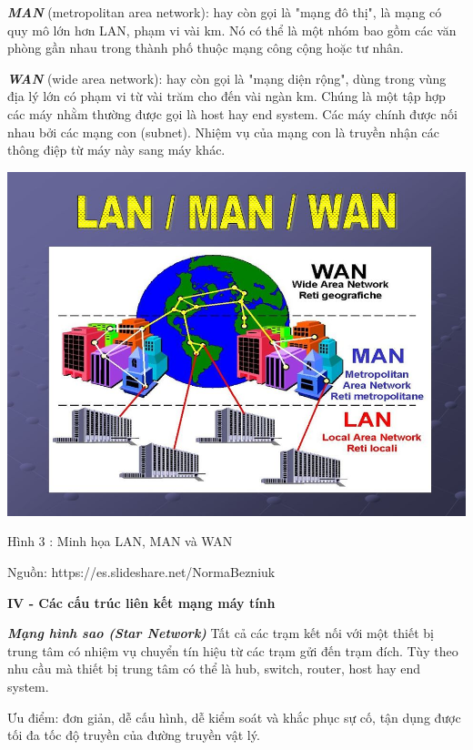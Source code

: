 \documentclass{report}
\begin{document}
\smallskip
\setlength{\parindent}{0.2cm}
\textbf{\textit{MAN}} (metropolitan area network): hay còn gọi là "mạng đô thị", là mạng có quy mô lớn hơn LAN, phạm vi vài km. Nó có thể là một nhóm bao gồm các văn phòng gần nhau trong thành phố thuộc mạng công cộng hoặc tư nhân.

\smallskip
\setlength{\parindent}{0.2cm}
\textbf{\textit{WAN}} (wide area network): hay còn gọi là "mạng diện rộng", dùng trong vùng địa lý lớn có phạm vi từ vài trăm cho đến vài ngàn km. Chúng là một tập hợp các máy nhằm thường được gọi là host hay end system. Các máy chính được nối nhau bởi các mạng con (subnet). Nhiệm vụ của mạng con là truyền nhận các thông điệp từ máy này sang máy khác.

\begin{center}
     \includegraphics[scale=0.35]{lan_man_wan}
\end{center}
\centerline{Hình 3 : Minh họa LAN, MAN và WAN}
\changefontsizes{12pt}
\centerline{Nguồn: https://es.slideshare.net/NormaBezniuk}


\bigskip
\changefontsizes{14pt}
\setlength{\parindent}{0.2cm}
\textbf{IV - Các cấu trúc liên kết mạng máy tính}

\changefontsizes{13pt}
\bigskip
\setlength{\parindent}{0.2cm}
\textbf{\textit{Mạng hình sao (Star Network)}} Tất cả các trạm kết nối với một thiết bị trung tâm có nhiệm vụ chuyển tín hiệu từ các trạm gửi đến trạm đích. Tùy theo nhu cầu mà thiết bị trung tâm có thể là hub, switch, router, host hay end system.

\smallskip
\setlength{\parindent}{1cm}
Ưu điểm: đơn giản, dễ cấu hình, dễ kiểm soát và khắc phục sự cố, tận dụng được tối đa tốc độ truyền của đường truyền vật lý.
\end{document}

